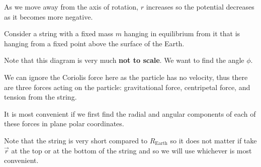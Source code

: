 \documentclass[../main.tex]{subfiles}
\begin{document}
As we move away from the axis of rotation, $r$ increases so the potential decreases as it becomes more negative.
\begin{example}
  Consider a string with a fixed mass $m$ hanging in equilibrium from it that is hanging from a fixed point above the surface of the Earth.
  \begin{center}
  \end{center}
  Note that this diagram is very much \textbf{not to scale}.
  We want to find the angle $\phi$.

  We can ignore the Coriolis force here as the particle has no velocity, thus there are three forces acting on the particle: gravitational force, centripetal force, and tension from the string.

  It is most convenient if  we first find the radial and angular components of each of these forces in plane polar coordinates.


  Note that the string is very short compared to $R_{\text{Earth}}$ so it does not matter if take $\vec{r}$ at the top or at the bottom of the string and so we will use whichever is most convenient.


\end{example}
\end{document}
